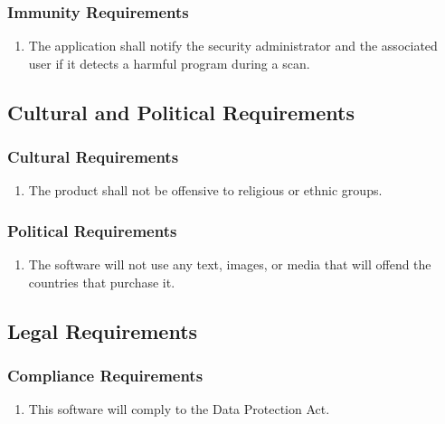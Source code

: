 \documentclass[]{article}
\begin{document}
\subsubsection{Immunity Requirements}
\label{ssub:immunity_requirements}
\begin{enumerate}[{SR}1. ]
	\item The application shall notify the security administrator and the
associated user if it detects a harmful program during a scan.
\end{enumerate}


\subsection{Cultural and Political Requirements}
\label{sub:cultural_and_political_requirements}

\subsubsection{Cultural Requirements}
\label{ssub:cultural_requirements}
\begin{enumerate}[{CP}1. ]
	\item The product shall not be offensive to religious or ethnic groups.
\end{enumerate}

\subsubsection{Political Requirements}
\label{ssub:political_requirements}
\begin{enumerate}[{CP}1. ]
	\item The software will not use any text, images, or media that will offend the
countries that purchase it.

\end{enumerate}


\subsection{Legal Requirements}
\label{sub:legal_requirements}

\subsubsection{Compliance Requirements}
\label{ssub:compliance_requirements}
\begin{enumerate}[{LR}1. ]
	\item  This software will comply to the Data Protection Act.
\end{enumerate}
\end{document}
